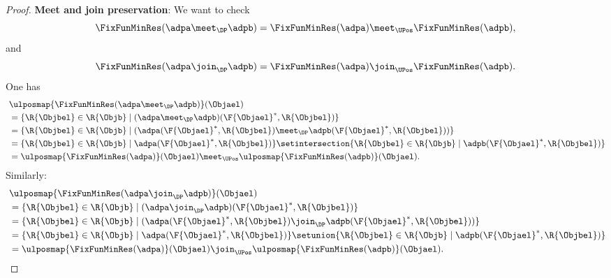 \begin{proof}
    \textbf{Meet and join preservation}:
    We want to check
    \begin{equation*}
        \FixFunMinRes(\adpa \meet_\DP \adpb)=\FixFunMinRes(\adpa) \meet_\UPos \FixFunMinRes(\adpb),
    \end{equation*}
    and
    \begin{equation*}
        \FixFunMinRes(\adpa \join_\DP \adpb)=\FixFunMinRes(\adpa) \join_\UPos \FixFunMinRes(\adpb).
    \end{equation*}
    One has
    \begin{equation*}
        \begin{aligned}
            ~ &
            \ulposmap{\FixFunMinRes(\adpa \meet_\DP \adpb)}(\Objael)                                                                                                         \\
              & =\{ \R{\Objbel} \in \R{\Objb} \mid (\adpa \meet_\DP \adpb)(\F{\Objael}^*,\R{\Objbel})\}                                                                      \\
              & =\{ \R{\Objbel} \in \R{\Objb} \mid (\adpa(\F{\Objael}^*,\R{\Objbel})\meet_\DP \adpb(\F{\Objael}^*,\R{\Objbel}))\}                                            \\
              & =\{ \R{\Objbel} \in \R{\Objb} \mid \adpa(\F{\Objael}^*,\R{\Objbel})\} \setintersection \{ \R{\Objbel} \in \R{\Objb} \mid  \adpb(\F{\Objael}^*,\R{\Objbel})\} \\
              & =\ulposmap{\FixFunMinRes(\adpa)}(\Objael) \meet_\UPos \ulposmap{\FixFunMinRes(\adpb)}(\Objael).
        \end{aligned}
    \end{equation*}
    Similarly:
    \begin{equation*}
        \begin{aligned}
            ~ &
            \ulposmap{\FixFunMinRes(\adpa \join_\DP \adpb)}(\Objael)                                                                                                  \\
              & =\{ \R{\Objbel} \in \R{\Objb} \mid (\adpa \join_\DP \adpb)(\F{\Objael}^*,\R{\Objbel})\}                                                               \\
              & =\{ \R{\Objbel} \in \R{\Objb} \mid (\adpa(\F{\Objael}^*,\R{\Objbel})\join_\DP \adpb(\F{\Objael}^*,\R{\Objbel}))\}                                     \\
              & =\{ \R{\Objbel} \in \R{\Objb} \mid \adpa(\F{\Objael}^*,\R{\Objbel})\} \setunion \{ \R{\Objbel} \in \R{\Objb} \mid  \adpb(\F{\Objael}^*,\R{\Objbel})\} \\
              & =\ulposmap{\FixFunMinRes(\adpa)}(\Objael) \join_\UPos \ulposmap{\FixFunMinRes(\adpb)}(\Objael).
        \end{aligned}
    \end{equation*}


\end{proof}
